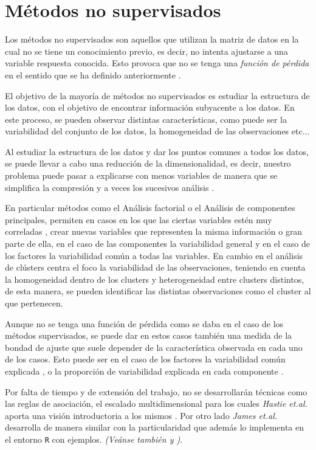\chapter{Métodos no supervisados}

\noindent Los métodos no supervisados son aquellos que utilizan la matriz de datos en la cual no se tiene un conocimiento previo, es decir, no intenta ajustarse a una variable respuesta conocida. Esto provoca que no se tenga una \emph{función de pérdida} en el sentido que se ha definido anteriormente \cite{Hastie 2001}. 

\noindent El objetivo de la mayoría de métodos no supervisados es estudiar la estructura de los datos, con el objetivo de encontrar información subyacente a los datos. En este proceso, se pueden observar distintas características, como puede ser la variabilidad del conjunto de los datos, la homogeneidad de las observaciones etc...

\noindent Al estudiar la estructura de los datos y dar los puntos comunes a todos los datos, se puede llevar a cabo una reducción de la dimensionalidad, es decir, nuestro problema puede pasar a explicarse con menos variables de manera que se simplifica la compresión y a veces los sucesivos análisis . 

\noindent En particular métodos como el Análisis factorial o el Análisis de componentes principales, permiten en casos en los que las ciertas variables estén muy correladas \cite{Everitt 2011}, crear nuevas variables que representen la misma información o gran parte de ella, en el caso de las componentes la variabilidad general y en el caso de los factores la variabilidad común a todas las variables. En cambio en el análisis de clústers centra el foco la variabilidad de las observaciones, teniendo en cuenta la homogeneidad dentro de los clusters y heterogeneidad entre clusters distintos, de esta manera, se pueden identificar las distintas observaciones como el cluster al que pertenecen. 

\noindent Aunque no se tenga una función de pérdida como se daba en el caso de los métodos supervisados, se puede dar en estos casos también una medida de la bondad de ajuste que suele depender de la característica observada en cada uno de los casos. Esto puede ser en el caso de los factores la variabilidad común explicada \cite{Peña 2002}, o la proporción de variabilidad explicada en cada componente \cite{Chatfield 1989}. 

\noindent Por falta de tiempo y de extensión del trabajo, no se desarrollarán técnicas como las reglas de asociación, el escalado multidimensional para los cuales \emph{Hastie et.al.} aporta una visión introductoria a los mismos \cite{Hastie 2001}. Por otro lado \emph{James et.al.}\cite{James 2013} desarrolla de manera similar con la particularidad  que además lo implementa en el entorno \texttt{R} con ejemplos. \emph{(Veánse también \cite{Everitt 2011} y \cite{Johnson 2007})}.

  


\newpage 

\newpage
